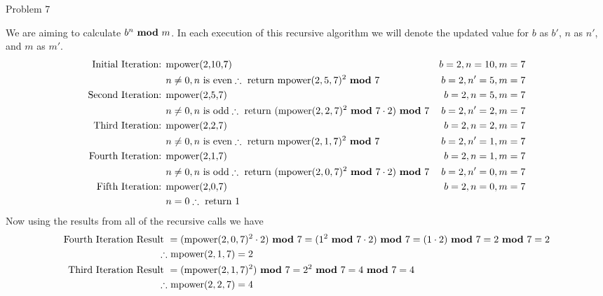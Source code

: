 \begin{problem}{Problem 7}
\begin{highlight}[Solution - \#6]
\begin{enumerate}[label = \arabic*., start = 6]
            We are aiming to calculate $b^{n} \text{ \textbf{mod} } m$. In each execution of this recursive algorithm we will denote the updated value for $b$ as $b'$, $n$ as $n'$, and $m$ as $m'$.
            \footnotesize{
                \begin{align*}
                    \text{Initial Iteration: } & \text{mpower(2,10,7)} & b = 2, n = 10, m = 7 \\
                    & n \neq 0, n \text{ is even} \therefore \text{ return \text{mpower}}(2,5,7)^{2} \text{ \textbf{mod} } 7 & b = 2, n' = 5, m = 7 \\
                    \text{Second Iteration: } & \text{mpower(2,5,7)} & b = 2, n = 5, m = 7 \\
                    & n \neq 0, n \text{ is odd} \therefore \text{ return }(\text{mpower}(2,2,7)^{2} \text{ \textbf{mod} } 7 \cdot 2) \text{ \textbf{mod} } 7 & b = 2, n' = 2, m = 7 \\
                    \text{Third Iteration: } & \text{mpower(2,2,7)} & b = 2, n = 2, m = 7 \\
                    & n \neq 0, n \text{ is even} \therefore \text{ return \text{mpower}}(2,1,7)^{2} \text{ \textbf{mod} } 7 & b = 2, n' = 1, m = 7 \\
                    \text{Fourth Iteration: } & \text{mpower(2,1,7)} & b = 2, n = 1, m = 7 \\
                    & n \neq 0, n \text{ is odd} \therefore \text{ return }(\text{mpower}(2,0,7)^{2} \text{ \textbf{mod} } 7 \cdot 2) \text{ \textbf{mod} } 7 & b = 2, n' = 0, m = 7 \\
                    \text{Fifth Iteration: } & \text{mpower(2,0,7)} & b = 2, n = 0, m = 7 \\
                    & n = 0 \therefore \text{ return 1} &
                \end{align*}
            }
            \normalsize
            Now using the results from all of the recursive calls we have
            \footnotesize{
                \begin{align*}
                    \text{Fourth Iteration Result } & = (\text{mpower}(2,0,7)^{2} \cdot 2) \modulo 7 = (1^{2} \modulo 7 \cdot 2) \modulo 7 = (1 \cdot 2) \modulo 7 = 2 \modulo 7 = 2 \\
                    \therefore & \text{ mpower}(2,1,7) = 2 \\
                    \text{Third Iteration Result } & = (\text{mpower}(2,1,7)^{2}) \modulo 7 = 2^{2} \modulo 7 = 4 \modulo 7 = 4 \\
                    \therefore & \text{ mpower}(2,2,7) = 4 \\

\end{align*}}
\end{enumerate}
\end{highlight}
\end{problem}
